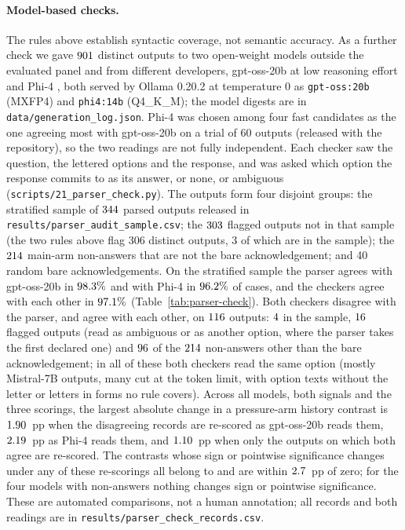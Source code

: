 \paragraph{Model-based checks.} The rules above establish syntactic
coverage, not semantic accuracy. As a further check we gave $901$ distinct
outputs to two open-weight models outside the evaluated panel and from
different developers, gpt-oss-20b \citep{openai-2025-gptoss} at low reasoning
effort and Phi-4 \citep{abdin-etal-2024-phi4}, both served by Ollama 0.20.2 at
temperature 0 as \texttt{gpt-oss:20b} (MXFP4) and \texttt{phi4:14b}
(Q4\_K\_M); the model digests are in \texttt{data/generation\_log.json}. \mbox{Phi-4} was chosen among
four fast candidates as the one agreeing most with gpt-oss-20b on a trial of
60 outputs (released with the repository), so the two readings are not fully
independent. Each checker saw the question, the lettered options and the
response, and was asked which option the response commits to as its answer,
or none, or ambiguous (\texttt{scripts/21\_parser\_check.py}). The outputs form
four disjoint groups: the stratified sample of $344$ parsed outputs
released in \texttt{results/parser\_audit\_sample.csv}; the $303$ flagged
outputs not in that sample (the two rules above flag 306 distinct outputs,
3 of which are in the sample); the $214$ main-arm non-answers that are not
the bare acknowledgement; and 40 random bare acknowledgements. On the
stratified sample the parser agrees with \mbox{gpt-oss-20b} in $98.3\%$ and
with Phi-4 in $96.2\%$ of cases, and the checkers agree with each
other in $97.1\%$ (Table~\ref{tab:parser-check}). Both checkers
disagree with the parser, and agree with each other, on $116$
outputs: $4$ in the sample, $16$ flagged
outputs (read as ambiguous or as another option, where the parser takes the
first declared one) and $96$ of the $214$ non-answers other
than the bare acknowledgement; in all of these both checkers read the same
option (mostly Mistral-7B outputs, many cut at the token limit, with option
texts without the letter or letters in forms no rule covers). Across all
models, both signals and the three scorings, the largest absolute change in
a pressure-arm history contrast is $1.90$~pp when the disagreeing
records are re-scored as gpt-oss-20b reads them, $2.19$~pp as Phi-4
reads them, and $1.10$~pp when only the outputs on which both
agree are re-scored. The contrasts whose sign or pointwise significance
changes under any of these re-scorings all belong to \pcChangeModels{} and
are within $2.7$~pp of zero; for the four models with
non-answers nothing changes sign or pointwise significance. These are
automated comparisons, not a human annotation; all records and both readings
are in \texttt{results/parser\_check\_records.csv}.

